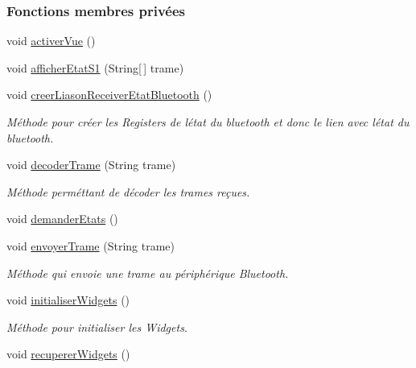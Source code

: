 \subsubsection*{Fonctions membres privées}
\begin{DoxyCompactItemize}
\item 
void \hyperlink{classcom_1_1lasalle_1_1io__trucks_1_1_main_activity_a09f9deded45d212d479d2206ddf52749}{activer\+Vue} ()
\item 
void \hyperlink{classcom_1_1lasalle_1_1io__trucks_1_1_main_activity_ac820f476b430c74a1201d9a906fd8429}{afficher\+Etat\+S1} (String\mbox{[}$\,$\mbox{]} trame)
\item 
void \hyperlink{classcom_1_1lasalle_1_1io__trucks_1_1_main_activity_a14d1db05fdfec7536d6b7c9809e360a0}{creer\+Liason\+Receiver\+Etat\+Bluetooth} ()
\begin{DoxyCompactList}\small\item\em Méthode pour créer les Registers de l\textquotesingle{}état du bluetooth et donc le lien avec l\textquotesingle{}état du bluetooth. \end{DoxyCompactList}\item 
void \hyperlink{classcom_1_1lasalle_1_1io__trucks_1_1_main_activity_afee6fb53a4414e7b577ea329fd473ba4}{decoder\+Trame} (String trame)
\begin{DoxyCompactList}\small\item\em Méthode perméttant de décoder les trames reçues. \end{DoxyCompactList}\item 
void \hyperlink{classcom_1_1lasalle_1_1io__trucks_1_1_main_activity_aa9cd705ec555f1a41d39172ad2e9fb61}{demander\+Etats} ()
\item 
void \hyperlink{classcom_1_1lasalle_1_1io__trucks_1_1_main_activity_af120db4bf132a5e3544a9e6722839a5e}{envoyer\+Trame} (String trame)
\begin{DoxyCompactList}\small\item\em Méthode qui envoie une trame au périphérique Bluetooth. \end{DoxyCompactList}\item 
void \hyperlink{classcom_1_1lasalle_1_1io__trucks_1_1_main_activity_a6c15e67f7d99f62d1e40de710216a1d7}{initialiser\+Widgets} ()
\begin{DoxyCompactList}\small\item\em Méthode pour initialiser les Widgets. \end{DoxyCompactList}\item 
void \hyperlink{classcom_1_1lasalle_1_1io__trucks_1_1_main_activity_a36109f04e626f0bf4c1a73da14c4fb2b}{recuperer\+Widgets} ()

\end{DoxyCompactItemize}
